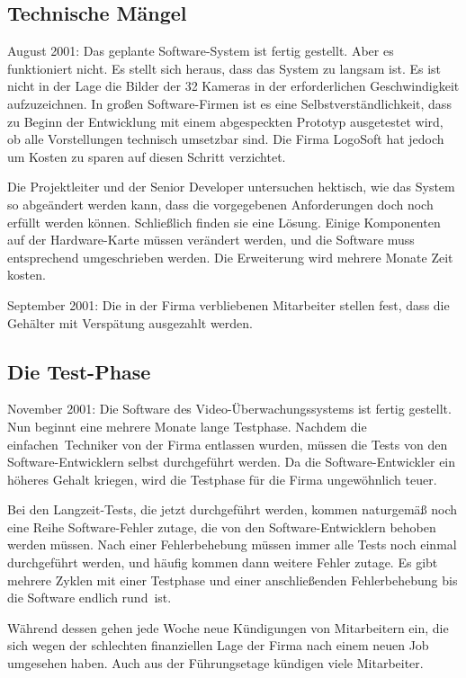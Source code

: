 \subsection{Technische Mängel}

August 2001: Das geplante Software-System ist fertig gestellt. Aber es
funktioniert nicht. Es stellt sich heraus, dass das System zu langsam ist. Es
ist nicht in der Lage die Bilder der 32 Kameras in der erforderlichen
Geschwindigkeit aufzuzeichnen. In großen Software-Firmen ist es eine
Selbstverständlichkeit, dass zu Beginn der Entwicklung mit einem abgespeckten
Prototyp ausgetestet wird, ob alle Vorstellungen technisch umsetzbar sind. Die
Firma LogoSoft hat jedoch um Kosten zu sparen auf diesen Schritt verzichtet.

Die Projektleiter und der Senior Developer untersuchen hektisch, wie das System
so abgeändert werden kann, dass die vorgegebenen Anforderungen doch noch
erfüllt werden können. Schließlich finden sie eine Lösung. Einige Komponenten
auf der Hardware-Karte müssen verändert werden, und die Software muss
entsprechend umgeschrieben werden. Die Erweiterung wird mehrere Monate Zeit
kosten.

September 2001: Die in der Firma verbliebenen Mitarbeiter stellen fest, dass
die Gehälter mit Verspätung ausgezahlt werden.


\subsection{Die Test-Phase}

November 2001: Die Software des Video-Überwachungssystems ist fertig gestellt.
Nun beginnt eine mehrere Monate lange Testphase. Nachdem die \glqq
einfachen\grqq\ Techniker von der Firma entlassen wurden, müssen die Tests von
den Software-Entwicklern selbst durchgeführt werden. Da die Software-Entwickler
ein höheres Gehalt kriegen, wird die Testphase für die Firma ungewöhnlich teuer.

Bei den Langzeit-Tests, die jetzt durchgeführt werden, kommen naturgemäß noch
eine Reihe Software-Fehler zutage, die von den Software-Entwicklern behoben
werden müssen. Nach einer Fehlerbehebung müssen immer alle Tests noch einmal
durchgeführt werden, und häufig kommen dann weitere Fehler zutage. Es gibt
mehrere Zyklen mit einer Testphase und einer anschließenden Fehlerbehebung bis
die Software endlich \glqq rund\grqq\ ist.

Während dessen gehen jede Woche neue Kündigungen von Mitarbeitern ein, die sich
wegen der schlechten finanziellen Lage der Firma nach einem neuen Job umgesehen
haben. Auch aus der Führungsetage kündigen viele Mitarbeiter.



